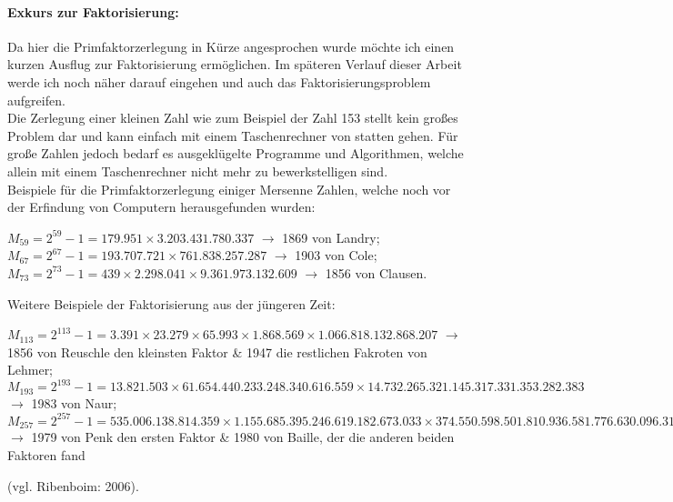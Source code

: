 \documentclass[german,12pt,a4paper]{article}
\begin{document}
\paragraph{Exkurs zur Faktorisierung:}Da hier die Primfaktorzerlegung in Kürze angesprochen wurde möchte ich einen kurzen Ausflug zur Faktorisierung ermöglichen. Im späteren Verlauf dieser Arbeit werde ich noch näher darauf eingehen und auch das Faktorisierungsproblem aufgreifen.\\
Die Zerlegung einer kleinen Zahl wie zum Beispiel der Zahl 153 stellt kein großes Problem dar und kann einfach mit einem Taschenrechner von statten gehen. Für große Zahlen jedoch bedarf es ausgeklügelte Programme und Algorithmen, welche allein mit einem Taschenrechner nicht mehr zu bewerkstelligen sind.\\
Beispiele für die Primfaktorzerlegung einiger Mersenne Zahlen, welche noch vor der Erfindung von Computern herausgefunden wurden:\
\begin{center}
$M_{59} = 2^{59}-1 = 179.951\times3.203.431.780.337$ $\rightarrow$ 1869 von Landry;\\
$M_{67} = 2^{67}-1 = 193.707.721\times761.838.257.287$ $\rightarrow$ 1903 von Cole;\\
$M_{73} = 2^{73}-1 = 439\times2.298.041\times9.361.973.132.609$ $\rightarrow$ 1856 von Clausen.\\
\end{center}
Weitere Beispiele der Faktorisierung aus der jüngeren Zeit:\
\begin{center}
$M_{113} = 2^{113}-1 = 3.391\times23.279\times65.993\times1.868.569\times1.066.818.132.868.207$ $\rightarrow$ 1856 von Reuschle den kleinsten Faktor \& 1947 die restlichen Fakroten von Lehmer;\\
$M_{193} = 2^{193}-1 = 13.821.503\times61.654.440.233.248.340.616.559\times14.732.265.321.145.317.331.353.282.383$ $\rightarrow$ 1983 von Naur;\\
$M_{257} = 2^{257}-1 = 535.006.138.814.359\times1.155.685.395.246.619.182.673.033\times374.550.598.501.810.936.581.776.630.096.313.181.393$ $\rightarrow$ 1979 von Penk den ersten Faktor \& 1980 von Baille, der die anderen beiden Faktoren fand\end{center} (vgl. Ribenboim: 2006).
\end{document}
